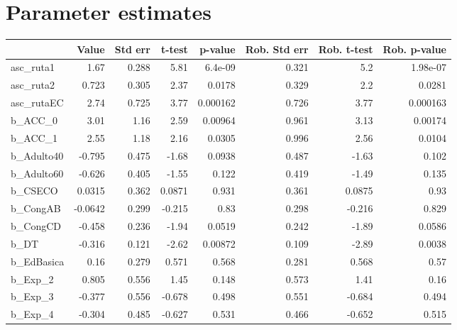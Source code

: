 \section{Parameter estimates}
\begin{tabular}{lrrrrrrr}
\toprule
{} &   Value &  Std err &   t-test &  p-value &  Rob. Std err &  Rob. t-test &  Rob. p-value \\
\midrule
asc\_ruta1     &    1.67 &    0.288 &     5.81 &  6.4e-09 &         0.321 &          5.2 &      1.98e-07 \\
asc\_ruta2     &   0.723 &    0.305 &     2.37 &   0.0178 &         0.329 &          2.2 &        0.0281 \\
asc\_rutaEC    &    2.74 &    0.725 &     3.77 & 0.000162 &         0.726 &         3.77 &      0.000163 \\
b\_ACC\_0       &    3.01 &     1.16 &     2.59 &  0.00964 &         0.961 &         3.13 &       0.00174 \\
b\_ACC\_1       &    2.55 &     1.18 &     2.16 &   0.0305 &         0.996 &         2.56 &        0.0104 \\
b\_Adulto40    &  -0.795 &    0.475 &    -1.68 &   0.0938 &         0.487 &        -1.63 &         0.102 \\
b\_Adulto60    &  -0.626 &    0.405 &    -1.55 &    0.122 &         0.419 &        -1.49 &         0.135 \\
b\_CSECO       &  0.0315 &    0.362 &   0.0871 &    0.931 &         0.361 &       0.0875 &          0.93 \\
b\_CongAB      & -0.0642 &    0.299 &   -0.215 &     0.83 &         0.298 &       -0.216 &         0.829 \\
b\_CongCD      &  -0.458 &    0.236 &    -1.94 &   0.0519 &         0.242 &        -1.89 &        0.0586 \\
b\_DT          &  -0.316 &    0.121 &    -2.62 &  0.00872 &         0.109 &        -2.89 &        0.0038 \\
b\_EdBasica    &    0.16 &    0.279 &    0.571 &    0.568 &         0.281 &        0.568 &          0.57 \\
b\_Exp\_2       &   0.805 &    0.556 &     1.45 &    0.148 &         0.573 &         1.41 &          0.16 \\
b\_Exp\_3       &  -0.377 &    0.556 &   -0.678 &    0.498 &         0.551 &       -0.684 &         0.494 \\
b\_Exp\_4       &  -0.304 &    0.485 &   -0.627 &    0.531 &         0.466 &       -0.652 &         0.515 \\

\end{tabular}
